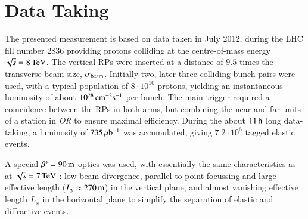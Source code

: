 \section{Data Taking}

The presented measurement is based on data taken in July 2012, during the LHC fill number 2836 providing protons colliding at the centre-of-mass energy $\sqrt s = 8\,{\rm TeV}$. The vertical RPs were inserted at a distance of $9.5$ times the transverse beam size, $\sigma_{\rm beam}$. Initially two, later three colliding bunch-pairs were used, with a typical population of $8\cdot10^{10}$ protons, yielding an instantaneous luminosity of about $10^{28}\,{\rm cm^{-2}s^{-1}}$ per bunch. The main trigger required a coincidence between the RPs in both arms, but combining the near and far units of a station in \textit{OR} to ensure maximal efficiency. During the about $11\,{\rm h}$ long data-taking, a luminosity of $735\,{\rm \mu b^{-1}}$ was accumulated, giving $7.2\cdot 10^6$ tagged elastic events.

A special $\beta^* = 90\,{\rm m}$ optics was used, with essentially the same characteristics as at $\sqrt s = 7\,{\rm TeV}$ \cite{epl96}: low beam divergence, parallel-to-point focussing and large effective length ($L_y \approx 270\,{\rm m}$) in the vertical plane, and almost vanishing effective length $L_x$ in the horizontal plane to simplify the separation of elastic and diffractive events.

